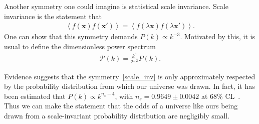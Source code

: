     Another symmetry one could imagine is statistical scale invariance.
    Scale invariance is the statement that
    \begin{align}\label{scale_inv}
        \left<f(\mathbf{x})f(\mathbf{x'})\right> = \left<f(\lambda\mathbf{x})f(\lambda\mathbf{x'})\right>.
    \end{align}
    One can show that this symmetry demands $P(k)\propto k^{-3}$.
    Motivated by this, it is usual to define the dimensionless power spectrum
    \begin{align}\label{primpowerspec_defn}
        \mathcal{P}(k) = \frac{k^3}{2\pi^2}P(k).
    \end{align}


    Evidence suggests that the symmetry~\eqref{scale_inv} is 
    only approximately respected by the probability
    distribution from which our universe was drawn.
    In fact, it has been estimated that $P(k)\propto k^{n_s-4}$, with $n_s=0.9649 \pm 0.0042$
    at $68\%$ CL~\cite{Planck_inflation_2015, Planck_inflation_2018}.
    Thus we can make the statement that
    the odds of a universe like ours being drawn from a scale-invariant probability
    distribution are negligibly small.






